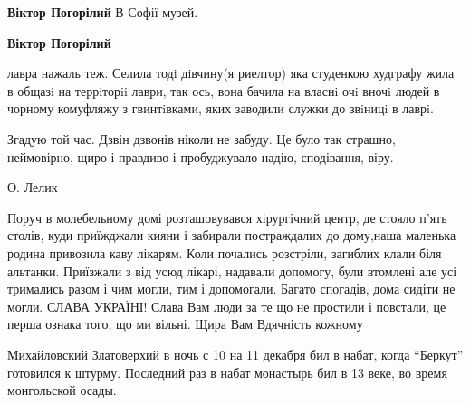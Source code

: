 \begin{itemize} %
\textbf{Віктор Погорілий} В Софії музей.

\textbf{Віктор Погорілий} 

лавра нажаль теж. Селила тодi дiвчину(я риелтор) яка студенкою худграфу жила в
общазi на террiторii лаври, так ось, вона бачила на власнi очi вночi людей в
чорному комуфляжу з гвинтiвками, яких заводили служки до звiницi в лаврi.


Згадую той час. Дзвін дзвонів ніколи не забуду. Це було так страшно,
неймовірно, щиро і правдиво і пробуджувало надію, сподівання, віру.

О. Лелик


Поруч в молебельному домі розташовувався хірургічний центр, де стояло п'ять
столів, куди приїжджали кияни і забирали постраждалих до дому,наша маленька
родина привозила каву лікарям. Коли почались розстріли, загиблих клали біля
альтанки. Приїзжали з від усюд лікарі, надавали допомогу, були втомлені але усі
тримались разом і чим могли, тим і допомогали. Багато спогадів, дома сидіти не
могли. СЛАВА УКРАЇНІ! Слава Вам люди за те що не простили і повстали, це перша
ознака того, що ми вільні. Щира Вам Вдячність кожному


Михайловский Златоверхий в ночь с 10 на 11 декабря бил в набат, когда
\enquote{Беркут} готовился к штурму.  Последний раз в набат монастырь бил в 13 веке, во
время монгольской осады.

\end{itemize} %
